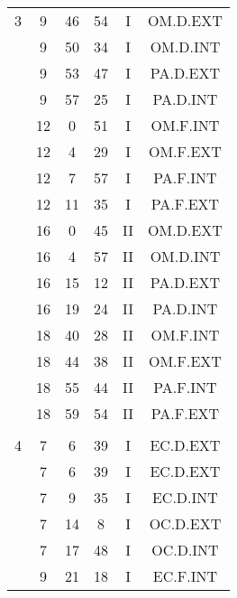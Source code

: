 \documentclass[12pt, a4paper]{article}
\begin{document}
\begin{multicols}{3}
{\begin{tabular}{c c c c c c}
	 	 	 	3 & 9 & 46 & 54 & I & OM.D.EXT\\%
	 	 	 	 & 9 & 50 & 34 & I & OM.D.INT\\%
	 	 	 	 & 9 & 53 & 47 & I & PA.D.EXT\\%
	 	 	 	 & 9 & 57 & 25 & I & PA.D.INT\\%
	 	 	 	 & 12 & 0 & 51 & I & OM.F.INT\\%
	 	 	 	 & 12 & 4 & 29 & I & OM.F.EXT\\%
	 	 	 	 & 12 & 7 & 57 & I & PA.F.INT\\%
	 	 	 	 & 12 & 11 & 35 & I & PA.F.EXT\\%
	 	 	 	 & 16 & 0 & 45 & II & OM.D.EXT\\%
	 	 	 	 & 16 & 4 & 57 & II & OM.D.INT\\%
	 	 	 	 & 16 & 15 & 12 & II & PA.D.EXT\\%
	 	 	 	 & 16 & 19 & 24 & II & PA.D.INT\\%
	 	 	 	 & 18 & 40 & 28 & II & OM.F.INT\\%
	 	 	 	 & 18 & 44 & 38 & II & OM.F.EXT\\%
	 	 	 	 & 18 & 55 & 44 & II & PA.F.INT\\%
	 	 	 	 & 18 & 59 & 54 & II & PA.F.EXT\\%
	 	 	 	 & & & & & \\%
	 	 	 	4 & 7 & 6 & 39 & I & EC.D.EXT\\%
	 	 	 	 & 7 & 6 & 39 & I & EC.D.EXT\\%
	 	 	 	 & 7 & 9 & 35 & I & EC.D.INT\\%
	 	 	 	 & 7 & 14 & 8 & I & OC.D.EXT\\%
	 	 	 	 & 7 & 17 & 48 & I & OC.D.INT\\%
	 	 	 	 & 9 & 21 & 18 & I & EC.F.INT\\%

\end{tabular}}
\end{multicols}
\end{document}
